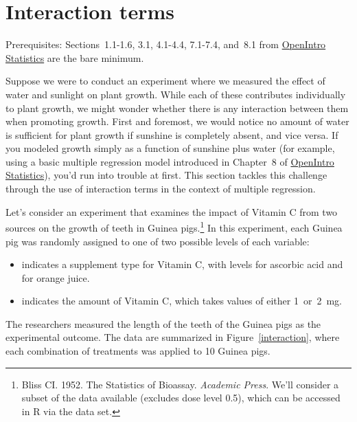 








\pagebreak
\section*{Interaction terms}

Prerequisites: Sections~1.1-1.6, 3.1, 4.1-4.4, 7.1-7.4, and~8.1 from \href{http://www.openintro.org/stat/textbook.php}{OpenIntro Statistics} are the bare minimum.

\begin{example}{Suppose we were to conduct an experiment where we measured the effect of water and sunlight on plant growth. While each of these contributes individually to plant growth, we might wonder whether there is any interaction between them when promoting growth.}
First and foremost, we would notice no amount of water is sufficient for plant growth if sunshine is completely absent, and vice versa. If you modeled growth simply as a function of sunshine plus water (for example, using a basic multiple regression model introduced in Chapter~8 of \href{http://www.openintro.org/stat/textbook.php}{OpenIntro Statistics}), you'd run into trouble at first. This section tackles this challenge through the use of interaction terms in the context of multiple regression.
\end{example}

Let's consider an experiment that examines the impact of Vitamin C from two sources on the growth of teeth in Guinea pigs.\footnote{Bliss CI. 1952. The Statistics of Bioassay. \emph{Academic Press}. We'll consider a subset of the data available (excludes dose level 0.5), which can be accessed in R via the  data set.} In this experiment, each Guinea pig was randomly assigned to one of two possible levels of each variable:
\begin{itemize}
\setlength{\itemsep}{0mm}
\item {} indicates a supplement type for Vitamin C, with levels  for ascorbic acid and  for orange juice.
\item {} indicates the amount of Vitamin C, which takes values of either 1~or~2~mg.
\end{itemize}
The researchers measured the length of the teeth of the Guinea pigs as the experimental outcome. The data are summarized in Figure~\ref{interaction}, where each combination of treatments was applied to 10 Guinea pigs.

